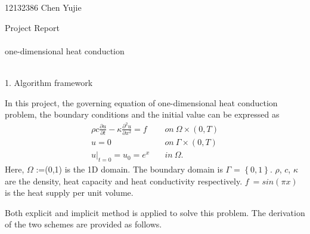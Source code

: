 \documentclass[a4paper,10pt]{article}
\begin{document}
12132386 Chen Yujie
\begin{center}
{\LARGE Project Report}
\\ \hspace*{\fill} \\
{\large one-dimensional heat conduction}
\\ \hspace*{\fill} \\
\end{center}

{\large 1. Algorithm framework}

In this project, the governing equation of one-dimensional heat conduction problem, the boundary conditions and the initial value can be expressed as
\begin{align}
\rho c\frac{\partial u}{\partial t}-\kappa \frac{\partial ^2 u}{\partial x^2}=f \quad &on\  \Omega \times (0,T) \\
u=0 \quad &on \  \Gamma \times (0,T) \\
u|_{t=0} =u_0 =  e^x \quad &in \ \Omega .
\end{align}
Here, $\Omega$ :=(0,1) is the 1D domain. The boundary domain is $\Gamma$ = $\left\{ 0,1 \right\} $. $\rho$, $c$, $\kappa$ are the density, heat capacity and heat conductivity respectively. $f \ =sin(\pi x)$ is the heat supply per unit volume. 

Both explicit and implicit method is applied to solve this problem. The derivation of the two schemes are provided as follows.
\end{document}
